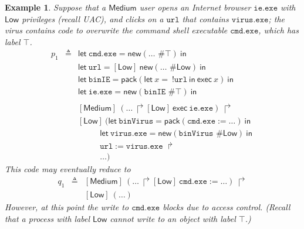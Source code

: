 \documentclass{sigplanconf}
\newcommand{\eval}[3]{\mathsf{let}~#1=#2~\mathsf{in}~#3}
\newtheorem{example}[definition]{Example}
\begin{document}
\begin{example}\label{eg:1} \rm Suppose that a $\mathsf{Medium}$ user opens an Internet browser $\mathtt{ie.exe}$ with $\mathsf{Low}$
privileges (recall UAC), and clicks on a $\mathtt{url}$ that contains $\mathtt{virus.exe}$; the virus contains code to overwrite
the command shell executable $\mathtt{cmd.exe}$, which has label $\top$. \begin{eqnarray*}
p_1\!\!\!\!&\triangleq&\!\!\!\eval{\mathtt{cmd.exe}}{\mathsf{new}(\dots\mbox{ \# }\top)}\\
\!\!\!\!&\!\!\!\!&\!\!\!\eval{\mathtt{url}}{[\mathsf{Low}]~\mathsf{new}(\dots\mbox{ \# }\mathsf{Low})}\\
\!\!\!\!&\!\!\!\!&\!\!\!\eval{\mathtt{binIE}}{\mathsf{pack}(\eval x {\:!\mathtt{url}}\mathsf{exec}~x)}\\
\!\!\!\!&\!\!\!\!&\!\!\!\eval{\mathtt{ie.exe}}{\mathsf{new}(\mathtt{binIE}\mbox{ \# }\top)}\\
\\
\!\!\!\!&\!\!\!\!&\!\!\![\mathsf{Medium}]~ (\dots ~\Rsh [\mathsf{Low}]~
\mathsf{exec}~\mathtt{ie.exe}) ~\Rsh\\
\!\!\!\!&\!\!\!\!&\!\!\![\mathsf{Low}]~ (\eval{\mathtt{binVirus}}{\mathsf{pack}(\mathtt{cmd.exe}
:= \dots)}\\
\!\!\!\!&\!\!\!\!&\!\!\!~~~~~~~~\:\:\:\:\eval{\mathtt{virus.exe}}{\mathsf{new}(\mathtt{binVirus}\mbox{ \# }\mathsf{Low})} \\
\!\!\!\!&\!\!\!\!&\!\!\!~~~~~~~~\:\:\:\:\mathtt{url} := 
\mathtt{virus.exe}~\Rsh\\
\!\!\!\!&\!\!\!\!&\!\!\!~~~~~~~~\:\:\:\:\dots) 
\end{eqnarray*}
This code may eventually reduce to 
\begin{eqnarray*}
q_1\!\!\!& \triangleq &\!\!\![\mathsf{Medium}]~ (\dots ~\Rsh [\mathsf{Low}]~
\mathtt{cmd.exe} := \dots)~\Rsh \\
&&\!\!\![\mathsf{Low}]~ (\dots)
\end{eqnarray*}
However, at this point the write to $\mathtt{cmd.exe}$ blocks due to
access control. (Recall that a process with label $\mathsf{Low}$ cannot write to an
object with label $\top$.)
\end{example}
\end{document}
